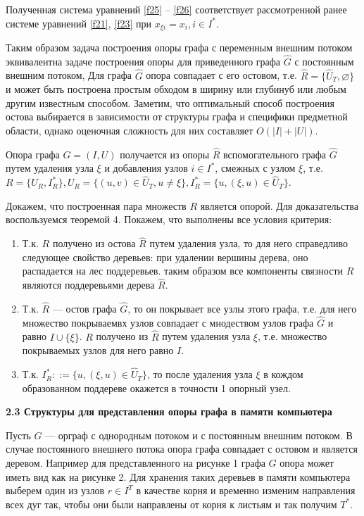 \documentclass[14pt]{extarticle}%
\begin{document}
Полученная система уравнений \eqref{f25} -- \eqref{f26} соответствует рассмотренной ранее системе уравнений \eqref{f21}, \eqref{f23} при $x_{\xi i}=x_i, i\in I^*$.

Таким образом задача построения опоры графа с переменным внешним потоком эквивалентна задаче построения опоры для приведенного графа $\widehat{G}$ с постоянным внешним потоком, Для графа $\widehat{G}$ опора совпадает с его остовом, т.е. $\widehat{R}=\{\widehat{U}_T,\varnothing\}$ и может быть построена простым обходом в ширину или глубинуб или любым другим известным способом. Заметим, что оптимальный способ построения остова выбирается в зависимости от структуры графа и специфики предметной области, однако оценочная сложность для них составляет $O(|I|+|U|)$.

Опора графа $G=(I,U)$ получается из опоры $\widehat{R}$ вспомогательного графа $\widehat{G}$ путем удаления узла $\xi$ и добавления узлов $i\in I^*$, смежных с узлом $\xi$, т.е. $R=\{U_R, I^*_R\}, U_R=\{(u,v)\in \widehat{U}_T,u\neq \xi\}, I^*_R=\{u,(\xi,u)\in \widehat{U}_T\}$.

Докажем, что построенная пара множеств $R$ является опорой. Для доказательства воспользуемся теоремой 4. Покажем, что выполнены все условия критерия:
\begin{enumerate}
 \item Т.к. $R$ получено из остова $\widehat{R}$ путем удаления узла, то для него справедливо следующее свойство деревьев: при удалении вершины дерева, оно распадается на лес поддеревьев. таким образом все компоненты связности $R$ являются поддеревьями дерева $\widehat{R}$.
 \item Т.к. $\widehat{R}$ --- остов графа $\widehat{G}$, то он покрывает все узлы этого графа, т.е. для него множество покрываемвх узлов совпадает с мнодеством узлов графа $\widehat{G}$ и равно $I\cup \{\xi\}$. $R$ получено из $\widehat{R}$ путем удаления узла $\xi$, т.е. множество покрываемых узлов для него равно $I$.
 \item Т.к. $I^*_R::=\{u,(\xi,u)\in \widehat{U}_T\}$, то после удаления узла $\xi$ в кождом образованном поддереве окажется в точности 1 опорный узел.
 \end{enumerate} 

\textbf{2.3 Структуры для представления опоры графа в памяти компьютера}

Пусть $G$ --- орграф с однородным потоком и с постоянным внешним потоком. В случае постоянного внешнего потока опора графа совпадает с остовом и является деревом. Например для представленного на рисунке 1 графа $G$ опора может иметь вид как на рисунке 2. Для хранения таких деревьев в памяти компьютера выберем один из узлов $r\in I^T$ в качестве корня и временно изменим направления всех дуг так, чтобы они были направлены от корня к листьям и так получим $T^*$.
\end{document}
